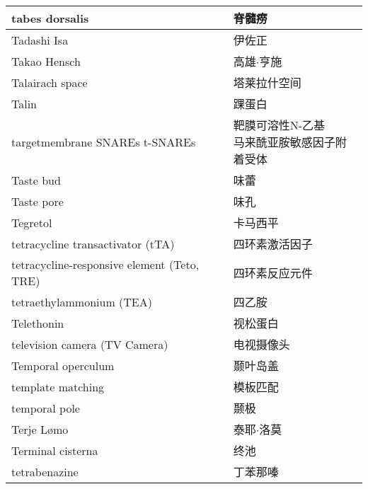 \begin{longtable}{lll}
	\midrule
	tabes dorsalis   && 	脊髓痨  \\
	
	\midrule
	Tadashi Isa   && 	伊佐正  \\
	
	\midrule
	Takao Hensch   && 	高雄$\cdot$亨施  \\
	
	\midrule
	Talairach space   && 	塔莱拉什空间  \\
	
	\midrule
	Talin   && 	踝蛋白  \\
	
	\midrule
	targetmembrane SNAREs t-SNAREs && 	\makecell{靶膜可溶性N-乙基\\马来酰亚胺敏感因子附着受体}  \\
	
	\midrule
	Taste bud   && 	味蕾  \\
	
	\midrule
	Taste pore   && 	味孔  \\
	
	\midrule
	Tegretol   && 	卡马西平  \\
	
	\midrule
	tetracycline transactivator (tTA)   && 四环素激活因子  \\
	
	\midrule
	tetracycline-responsive element (Teto, TRE)  && 四环素反应元件  \\
	
	\midrule
	tetraethylammonium (TEA)   && 四乙胺  \\
	
	\midrule
	Telethonin   && 视松蛋白  \\
	
	\midrule
	television camera (TV Camera)   && 电视摄像头  \\
	
	\midrule
	Temporal operculum   && 颞叶岛盖  \\
	
	\midrule
	template matching   && 模板匹配  \\
	
	\midrule
	temporal pole   && 颞极  \\
	
	\midrule
	Terje Lømo   && 泰耶$\cdot$洛莫  \\
	
	\midrule
	Terminal cisterna   && 终池  \\
	
	\midrule
	tetrabenazine  && 丁苯那嗪  \\
	

\end{longtable}
